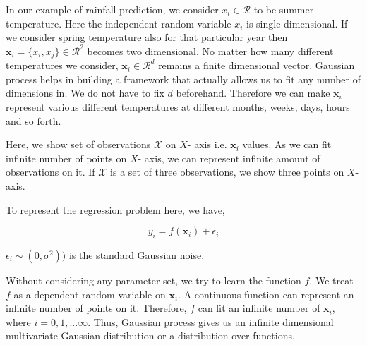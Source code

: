 \documentclass[english]{tktltiki}
\begin{document}
In our example of rainfall prediction, we consider $x_i \in \mathcal{R}$ to be summer temperature. Here the independent random variable $x_i$ is single dimensional. If we consider spring temperature also for that particular year then $\mathbf{x}_i = \{x_i, x_j\} \in \mathcal{R}^2$ becomes two dimensional. No matter how many different temperatures we consider, $\mathbf{x}_i \in \mathcal{R}^d$ remains a finite dimensional vector. Gaussian process helps in building a framework that actually allows us to fit any number of dimensions in. We do not have to fix $d$ beforehand. Therefore we can make $\mathbf{x}_i$ represent various different temperatures at different months, weeks, days, hours and so forth.

Here, we show set of observations $\mathcal{X}$ on $X$- axis i.e. $\mathbf{x}_i$ values. As we can fit infinite number of points on $X$- axis, we can represent infinite amount of observations on it. If $\mathcal{X}$ is a set of three observations, we show three points on $X$-axis.

To represent the regression problem here, we have,

\begin{equation}
y_i = f(\mathbf{x}_i) + \epsilon_i
\label{reg_sym_noise}
\end{equation}

$\epsilon_i \sim (0, \sigma^2))$ is the standard Gaussian noise.

Without considering any parameter set, we try to learn the function $f$. We treat $f$ as a dependent random variable on $\mathbf{x}_i$. A continuous function can represent an infinite number of points on it. Therefore, $f$ can fit an infinite number of $\mathbf{x}_i$, where $i = 0, 1, ... \infty$. Thus, Gaussian process gives us an infinite dimensional multivariate Gaussian distribution or a distribution over functions.
\end{document}
